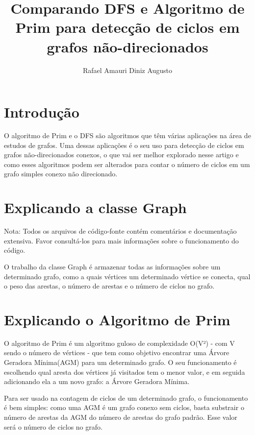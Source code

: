 \documentclass[12pt]{article}
\title{Comparando DFS e Algoritmo de Prim para detecção de ciclos em grafos não-direcionados}
\author{Rafael Amauri Diniz Augusto}
\begin{document}
\maketitle

\tableofcontents
\newpage

\section{Introdução}
O algoritmo de Prim e o DFS são algoritmos que têm várias aplicações na área de estudos de grafos. 
Uma dessas aplicações é o seu uso para detecção de ciclos em grafos não-direcionados conexos, o
que vai ser melhor explorado nesse artigo e como esses algoritmos podem ser alterados para
contar o número de ciclos em um grafo simples conexo não direcionado.\vspace{10pt}


\section{Explicando a classe Graph}


Nota: Todos os arquivos de código-fonte contém comentários e documentação extensiva. Favor
consultá-los para mais informações sobre o funcionamento do código.\vspace{10pt}


O trabalho da classe Graph é armazenar todas as informações sobre um determinado grafo, como 
a quais vértices um determinado vértice se conecta, qual o peso das arestas, o número de arestas
e o número de ciclos no grafo.\vspace{10pt}


\section{Explicando o Algoritmo de Prim}
O algoritmo de Prim é um algoritmo guloso de complexidade O(V²) - com V sendo o número de 
vértices - que tem como objetivo encontrar uma Árvore Geradora Mínima(AGM) para um determinado 
grafo. O seu funcionamento é escolhendo qual aresta dos vértices já visitados tem o menor valor, 
e em seguida adicionando ela a um novo grafo: a Árvore Geradora Mínima.

Para ser usado na contagem de ciclos de um determinado grafo, o funcionamento é bem simples: como
uma AGM é um grafo conexo sem ciclos, basta substrair o número de arestas da AGM do número de
arestas do grafo padrão. Esse valor será o número de ciclos no grafo.\vspace{10pt}
\end{document}
